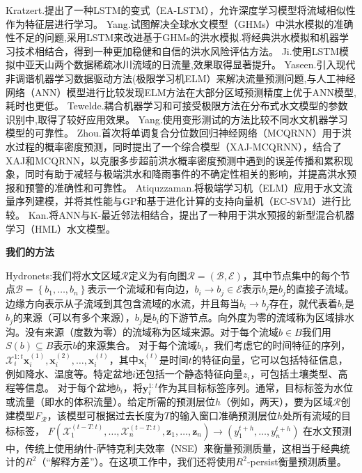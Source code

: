 \documentclass{ctexart}
\begin{document}
Kratzert.\cite{kratzert2019towards}提出了一种LSTM的变式（EA-LSTM），允许深度学习模型将流域相似性作为特征层进行学习。
Yang.\cite{yang2019evaluation}试图解决全球水文模型（GHMs）中洪水模拟的准确性不足的问题,采用LSTM来改进基于GHMs的洪水模拟.将经典洪水模拟和机器学习技术相结合，得到一种更加稳健和自信的洪水风险评估方法。
Ji.\cite{ji2021adaptability}使用LSTM模拟中亚天山两个数据稀疏冰川流域的日流量,效果取得显著提升。
Yaseen.\cite{yaseen2018non}引入现代非调谐机器学习数据驱动方法(极限学习机ELM）来解决流量预测问题,与人工神经网络（ANN）模型进行比较发现ELM方法在大部分区域预测精度上优于ANN模型,耗时也更低。
Tewelde.\cite{teweldebrhan2020coupled}耦合机器学习和可接受极限方法在分布式水文模型的参数识别中,取得了较好应用效果。
Yang.\cite{yang2021reliability}使用变形测试的方法比较不同水文机器学习模型的可靠性。
Zhou.\cite{zhou2021short}首次将单调复合分位数回归神经网络（MCQRNN）用于洪水过程的概率密度预测，同时提出了一个综合模型（XAJ-MCQRNN），结合了XAJ和MCQRNN，以克服多步超前洪水概率密度预测中遇到的误差传播和累积现象，同时有助于减轻与极端洪水和降雨事件的不确定性相关的影响，并提高洪水预报和预警的准确性和可靠性。
Atiquzzaman.\cite{atiquzzaman2018robustness}将极端学习机（ELM）应用于水文流量序列建模，并将其性能与GP和基于进化计算的支持向量机（EC-SVM）进行比较。
Kan.\cite{kan2020hybrid}将ANN与K-最近邻法相结合，提出了一种用于洪水预报的新型混合机器学习（HML）水文模型。

\textbf{我们的方法}

Hydronets\cite{moshe2020hydronets}:我们将水文区域$\mathcal{R}$定义为有向图$\mathcal{R}=(\mathcal{B}, \mathcal{E})$，其中节点集中的每个节点$\mathcal{B}=\left\{b_{1}, \ldots, b_{n}\right\}$表示一个流域和有向边，$b_{i} \rightarrow b_{j} \in \mathcal{E}$表示$b_{i}$是$b_{j}$的直接子流域。边缘方向表示从子流域到其包含流域的水流，并且每当$b_{i} \rightarrow b_{j}$存在，就代表着$b_{i}$是$b_{j}$的来源（可以有多个来源），$b_{j}$是$b_{i}$的下游节点。向外度为零的流域称为区域排水沟。没有来源（度数为零）的流域称为区域来源。对于每个流域$b \in B$我们用$S(b) \subseteq B$表示$b$的来源集合。
对于每个流域$b_{i}$，我们考虑它的时间特征的序列，$\mathcal{X}_{i}^{1: t} \mathbf{x}_{i}^{(1)}, \mathbf{x}_{i}^{(2)}, \ldots, \mathbf{x}_{i}^{(t)}$，其中$\mathbf{x}_{i}^{(t)}$是时间$t$的特征向量，它可以包括特征信息，例如降水、温度等。特定盆地$i$还包括一个静态特征向量$z_{i}$，可包括土壤类型、高程等信息。
对于每个盆地$b_{i}$，将$\mathbf{y}_{i}^{1: t}$作为其目标标签序列。通常，目标标签为水位或流量（即水的体积流量）。给定所需的预测层位$h$（例如，两天），要为区域$\mathcal{R}$创建模型$F_{\mathcal{R}}$，该模型可根据过去长度为$T$的输入窗口准确预测层位$h$处所有流域的目标标签，
$F\left(\mathcal{X}_{1}^{(t-T: t)}, \ldots, \mathcal{X}_{n}^{(t-T: t)}, \mathbf{z}_{1}, \ldots, \mathbf{z}_{n}\right) \rightarrow\left(y_{1}^{t+h}, \ldots, y_{n}^{t+h}\right)$
在水文预测中，传统上使用纳什-萨特克利夫效率（NSE）来衡量预测质量，这相当于经典统计的$R^{2}$（“解释方差”）。在这项工作中，我们还将使用$R^{2}$-persist衡量预测质量。
\end{document}
